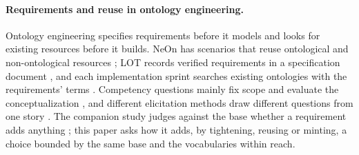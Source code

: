 \paragraph{Requirements and reuse in ontology engineering.}
Ontology engineering specifies requirements before it models and looks for existing resources before it builds.
NeOn has scenarios that reuse ontological and non-ontological resources \cite{suarez2012neon}; LOT records
verified requirements in a specification document \cite{suarez2009orsd}, and each implementation sprint searches
existing ontologies with the requirements' terms \cite{poveda2022lot}.
Competency questions mainly fix scope and evaluate the conceptualization \cite{monfardini2023}, and different
elicitation methods draw different questions from one story \cite{alharbi2026cq}.
The companion study judges against the base whether a requirement adds anything \cite{anon2027rq1}; this paper asks
how it adds, by tightening, reusing or minting, a choice bounded by the same base and the vocabularies within
reach.

